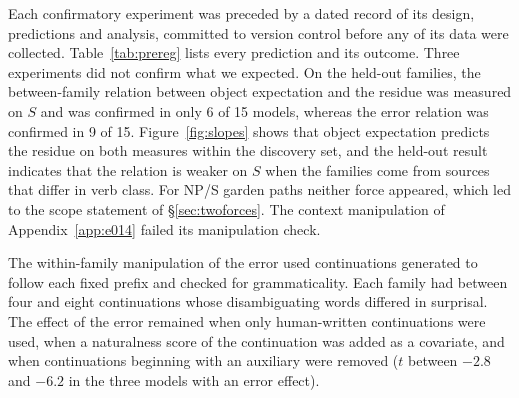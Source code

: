Each confirmatory experiment was preceded by a dated record of its design, predictions and analysis, committed to version control before any of its data were collected.
Table~\ref{tab:prereg} lists every prediction and its outcome.
Three experiments did not confirm what we expected.
On the held-out families, the between-family relation between object expectation and the residue was measured on $S$ and was confirmed in only 6 of 15 models, whereas the error relation was confirmed in 9 of 15.
Figure~\ref{fig:slopes} shows that object expectation predicts the residue on both measures within the discovery set, and the held-out result indicates that the relation is weaker on $S$ when the families come from sources that differ in verb class.
For NP/S garden paths neither force appeared, which led to the scope statement of \S\ref{sec:twoforces}.
The context manipulation of Appendix~\ref{app:e014} failed its manipulation check.

The within-family manipulation of the error used continuations generated to follow each fixed prefix and checked for grammaticality.
Each family had between four and eight continuations whose disambiguating words differed in surprisal.
The effect of the error remained when only human-written continuations were used, when a naturalness score of the continuation was added as a covariate, and when continuations beginning with an auxiliary were removed ($t$ between $-2.8$ and $-6.2$ in the three models with an error effect).

